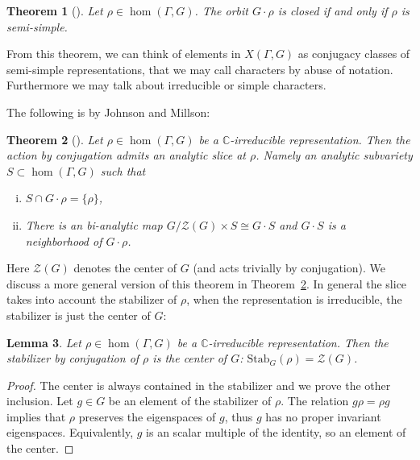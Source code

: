\documentclass[a4paper,11pt]{article}
\newtheorem{Theorem}{Theorem}[section]
\newtheorem{Lemma}[Theorem]{Lemma}
\begin{document}
\begin{Theorem}[\cite{RichardsonDuke}]
Let $\rho\in 
\hom( \Gamma, G )$. The orbit  $G\cdot\rho$  is closed if and only if $\rho$ is semi-simple. 
\end{Theorem}
 
  

From this theorem, we can think of elements in $X(\Gamma, G)$
as conjugacy classes of semi-simple representations, that we may call
characters by abuse of notation. Furthermore we may talk about irreducible or simple characters.


The following is \cite[Theorem~1.2]{JohnsonMillson} by Johnson and Millson:

\begin{Theorem}[\cite{JohnsonMillson}]
\label{Theorem:slices}
Let $\rho\in \hom(\Gamma, G)$ be a $\mathbb C$-irreducible representation. Then 
the action by conjugation admits an analytic slice at $\rho$. Namely an   analytic subvariety 
 $S\subset   \hom(\Gamma, G)$ such that
  \begin{enumerate}[(i)]
  \item   $S\cap G\cdot\rho=\{\rho\}$,
 \item There is an bi-analytic map 
 $G/\mathcal Z(G)\times S\cong G\cdot S$ and $ G\cdot S$ is a  neighborhood of $G\cdot \rho$.
 \end{enumerate}
\end{Theorem}


Here $\mathcal Z(G)$ denotes the center of $G$ (and acts trivially by conjugation).
We discuss a more general version of this theorem in Theorem~\ref{Theorem:slices}.
In general the slice takes into account the stabilizer of $\rho$, when the representation is irreducible, the stabilizer is just the center of $G$:

\begin{Lemma}
\label{lemma:stabirr}
Let $\rho\in \hom(\Gamma, G)$ be a $\mathbb C$-irreducible representation. Then the stabilizer by conjugation of $\rho$ is the center of $G$:
$
\mathrm{Stab}_G(\rho)=\mathcal Z(G)
$.
\end{Lemma}


\begin{proof}
 The center is always contained in the stabilizer and we prove the other inclusion. Let $g\in G$ be an element of the stabilizer of $\rho$. 
 The relation $g\rho=\rho g$ implies that $\rho$ preserves the  eigenspaces of $g$, thus $g$ has no proper invariant  eigenspaces. Equivalently, $g$ is an scalar multiple of the identity, so an element of the 
 center.
\end{proof}
\end{document}
